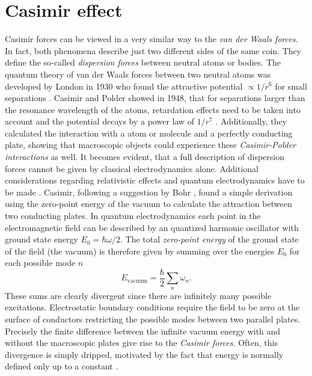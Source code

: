 \chapter{Casimir effect}\label{cha:casimir-effect}

Casimir forces can be viewed in a very similar way to the \textit{van der Waals forces}. In fact, both phenomena describe just two different sides of the same coin. They define the so-called \emph{dispersion forces} between neutral atoms or bodies.
The quantum theory of van der Waals forces between two neutral atoms was developed by London in 1930 who found the attractive potential $\propto 1/r^6$ for small separations \cite{London_1930}.
Casimir and Polder showed in 1948, that for separations larger than the resonance wavelength of the atoms, retardation effects need to be taken into account and the potential decays by a power law of $1/r^7$ \cite{Casimir_1948a}. 
Additionally, they calculated the interaction with a atom or molecule and a perfectly conducting plate, showing that macroscopic objects could experience these \emph{Casimir-Polder interactions} as well.
It becomes evident, that a full description of dispersion forces cannot be given by classical electrodynamics alone. Additional considerations regarding relativistic effects and quantum electrodynamics have to be made \cite{Bordag_2001,Klimchitskaya_2009,Lamoreaux_2004}.
Casimir, following a suggestion by Bohr \cite{Bordag_1999}, found a simple derivation using the zero-point energy of the vacuum to calculate the attraction between two conducting plates.
In quantum electrodynamics each point in the electromagnetic field can be described by an quantized harmonic oscillator with ground state energy $E_0 = \hbar\omega/2$.
The total \textit{zero-point energy} of the ground state of the field (the vacuum) is therefore given by summing over the energies $E_0$ for each possible mode $n$
\begin{equation}
  E_\mathrm{vacuum} = \frac{\hbar}{2} \sum_n \omega_n.
\end{equation} 
These sums are clearly divergent since there are infinitely many possible excitations.
Electrostatic boundary conditions require the field to be zero at the surface of conductors restricting the possible modes between two parallel plates.
Precisely the finite difference between the infinite vacuum energy with and without the macroscopic plates give rise to the \emph{Casimir forces}.
Often, this divergence is simply dripped, motivated by the fact that energy is normally defined only up to a constant \cite{Bordag_2001}. 
